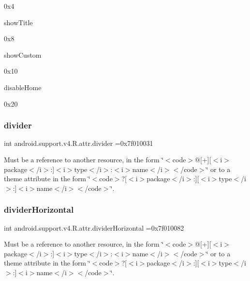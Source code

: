 0x4

{\ttfamily show\+Title}

0x8

{\ttfamily show\+Custom}

0x10

{\ttfamily disable\+Home}

0x20\mbox{\label{classandroid_1_1support_1_1v4_1_1R_1_1attr_a47e79e4bd7c9a45a24028c0210cf5744}} 
\subsubsection{\texorpdfstring{divider}{divider}}
{\footnotesize\ttfamily int android.\+support.\+v4.\+R.\+attr.\+divider =0x7f010031\hspace{0.3cm}{\ttfamily [static]}}

Must be a reference to another resource, in the form \char`\"{}$<$code$>$@\mbox{[}+\mbox{]}\mbox{[}$<$i$>$package$<$/i$>$\+:\mbox{]}$<$i$>$type$<$/i$>$\+:$<$i$>$name$<$/i$>$$<$/code$>$\char`\"{} or to a theme attribute in the form \char`\"{}$<$code$>$?\mbox{[}$<$i$>$package$<$/i$>$\+:\mbox{]}\mbox{[}$<$i$>$type$<$/i$>$\+:\mbox{]}$<$i$>$name$<$/i$>$$<$/code$>$\char`\"{}. \mbox{\label{classandroid_1_1support_1_1v4_1_1R_1_1attr_aba7557dd9e65f47065970b2ee2447f6d}} 
\subsubsection{\texorpdfstring{divider\+Horizontal}{dividerHorizontal}}
{\footnotesize\ttfamily int android.\+support.\+v4.\+R.\+attr.\+divider\+Horizontal =0x7f010082\hspace{0.3cm}{\ttfamily [static]}}

Must be a reference to another resource, in the form \char`\"{}$<$code$>$@\mbox{[}+\mbox{]}\mbox{[}$<$i$>$package$<$/i$>$\+:\mbox{]}$<$i$>$type$<$/i$>$\+:$<$i$>$name$<$/i$>$$<$/code$>$\char`\"{} or to a theme attribute in the form \char`\"{}$<$code$>$?\mbox{[}$<$i$>$package$<$/i$>$\+:\mbox{]}\mbox{[}$<$i$>$type$<$/i$>$\+:\mbox{]}$<$i$>$name$<$/i$>$$<$/code$>$\char`\"{}. \mbox{\label{classandroid_1_1support_1_1v4_1_1R_1_1attr_a461342995bae205ef8b059feee4e4b9e}} 
